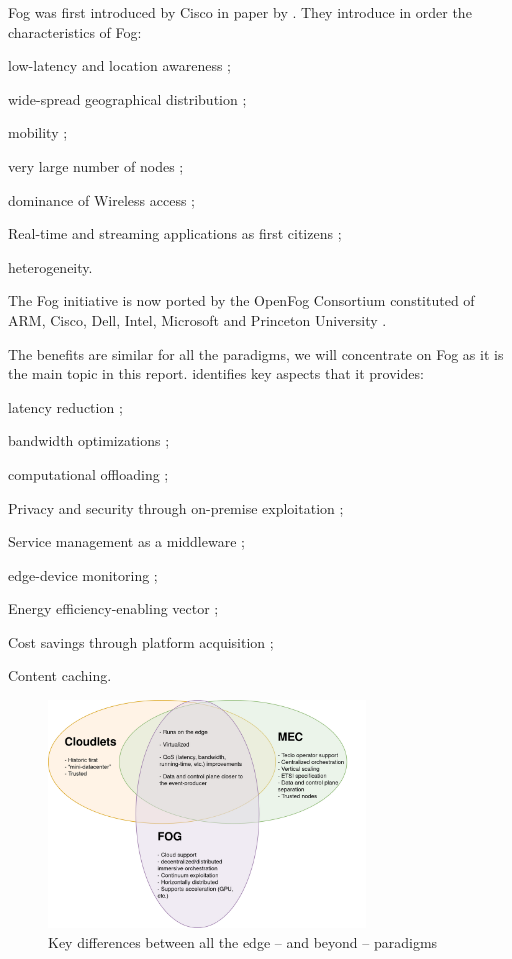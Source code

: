 \documentclass[11pt]{sdm}
\begin{document}
\begin{description}
	Fog was first introduced by Cisco in  paper by . They introduce in order the characteristics of Fog:
	\begin{enumerate*}[(i)]
		\item low-latency and location awareness ;
		\item wide-spread geographical distribution ;
		\item mobility ;
		\item very large number of nodes ;
		\item dominance of Wireless access ;
		\item Real-time and streaming applications as first citizens ;
		\item heterogeneity.
	\end{enumerate*}
	The Fog initiative is now ported by the OpenFog Consortium \cite{ieee_standards_association_ieee_2018} constituted of ARM, Cisco, Dell, Intel, Microsoft and Princeton University \cite{chiang_fog_2016}.
\end{description}

The benefits are similar for all the paradigms, we will concentrate on Fog as it is the main topic in this report. \citet{ahmed_fog_2019, ai_edge_2018} identifies key aspects that it provides:
\begin{enumerate*}[(1)]
	\item latency reduction ;
	\item bandwidth optimizations ;
	\item computational offloading ;
	\item Privacy and security through on-premise exploitation ;
	\item Service management as a middleware ;
	\item edge-device monitoring ;
	\item Energy efficiency-enabling vector ;
	\item Cost savings through platform acquisition ;
	\item Content caching.
\end{enumerate*}

\begin{figure}[t]
	\centering
	\includegraphics[width=0.75\textwidth]{./assets/CloudLetsVMECvFog.drawio.png}
	\caption{Key differences between all the edge -- and beyond -- paradigms}
	\label{fig:fogVall}
\end{figure}
\end{document}

